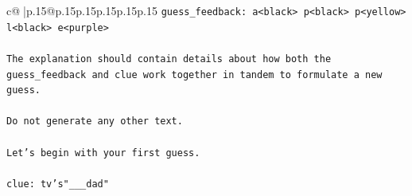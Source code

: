 \documentclass{article}
\begin{document}
{\begin{supertabular}{c@{$\;$}|p{.15\linewidth}@{}p{.15\linewidth}p{.15\linewidth}p{.15\linewidth}p{.15\linewidth}p{.15\linewidth}}
{{{\texttt{guess\_feedback: a<black> p<black> p<yellow> l<black> e<purple>} \\
\\ 
\texttt{The explanation should contain details about how both the guess\_feedback and clue work together in tandem to formulate a new guess.} \\
\\ 
\texttt{Do not generate any other text.} \\
\\ 
\texttt{Let's begin with your first guess.} \\
\\ 
\texttt{clue: tv's"\_\_\_dad"} \\
            }
        }
    }
     \\ \\


\end{supertabular}}
\end{document}
